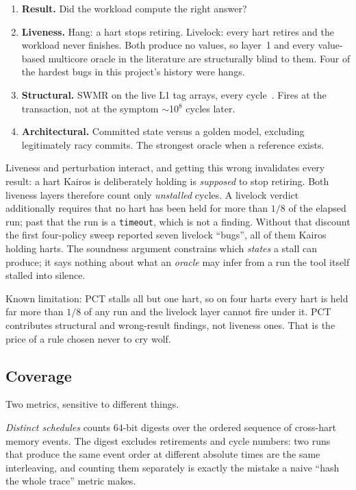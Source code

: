 \documentclass[sigconf,anonymous,review]{acmart}
\begin{document}
\begin{enumerate}
\item \textbf{Result.} Did the workload compute the right answer?
\item \textbf{Liveness.} Hang: a hart stops retiring.
  Livelock: every hart retires and the workload never finishes. Both
  produce no values, so layer~1 and every value-based multicore oracle
  in the literature are structurally blind to them. Four of the
  hardest bugs in this project's history were hangs.
\item \textbf{Structural.} SWMR on the live L1 tag arrays, every
  cycle~\cite{sorin2011primer}. Fires at the transaction, not at the
  symptom $\sim$10$^8$ cycles later.
\item \textbf{Architectural.} Committed state versus a golden model,
  excluding legitimately racy commits. The strongest oracle when a
  reference exists.
\end{enumerate}

Liveness and perturbation interact, and getting this wrong invalidates
every result: a hart Kairos is deliberately holding is \emph{supposed}
to stop retiring. Both liveness layers therefore count only
\emph{unstalled} cycles. A livelock verdict additionally requires that
no hart has been held for more than $1/8$ of the elapsed run; past
that the run is a \texttt{timeout}, which is not a finding. Without
that discount the first four-policy sweep reported seven livelock
``bugs'', all of them Kairos holding harts. The soundness argument
constrains which \emph{states} a stall can produce; it says nothing
about what an \emph{oracle} may infer from a run the tool itself
stalled into silence.

Known limitation: PCT stalls all but one hart, so on four harts every
hart is held far more than $1/8$ of any run and the livelock layer
cannot fire under it. PCT contributes structural and wrong-result
findings, not liveness ones. That is the price of a rule chosen never
to cry wolf.

\subsection{Coverage}
\label{sec:coverage}

Two metrics, sensitive to different things.

\emph{Distinct schedules} counts 64-bit digests over the ordered
sequence of cross-hart memory events. The digest excludes retirements
and cycle numbers: two runs that produce the same event order at
different absolute times are the same interleaving, and counting them
separately is exactly the mistake a naive ``hash the whole trace''
metric makes.
\end{document}
